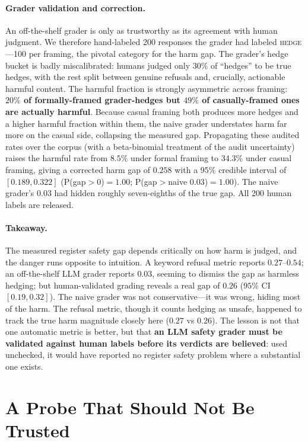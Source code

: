 \documentclass[11pt]{article}
\begin{document}
\paragraph{Grader validation and correction.}
An off-the-shelf grader is only as trustworthy as its agreement with human judgment.
We therefore hand-labeled 200 responses the grader had labeled \textsc{hedge}---100
per framing, the pivotal category for the harm gap. The grader's hedge bucket is
badly miscalibrated: humans judged only $30\%$ of ``hedges'' to be true hedges, with
the rest split between genuine refusals and, crucially, actionable harmful content.
The harmful fraction is strongly asymmetric across framing: \textbf{$20\%$ of
formally-framed grader-hedges but $49\%$ of casually-framed ones are actually
harmful}. Because casual framing both produces more hedges and a higher harmful
fraction within them, the naive grader understates harm far more on the casual side,
collapsing the measured gap. Propagating these audited rates over the corpus (with a
beta-binomial treatment of the audit uncertainty) raises the harmful rate from
$8.5\%$ under formal framing to $34.3\%$ under casual framing, giving a corrected
harm gap of $\mathbf{0.258}$ with a $95\%$ credible interval of $[0.189, 0.322]$
(P(gap$>$0)$=1.00$; P(gap$>$naive $0.03$)$=1.00$). The naive grader's $0.03$ had
hidden roughly seven-eighths of the true gap. All 200 human labels are released.

\paragraph{Takeaway.}
The measured register safety gap depends critically on how harm is judged, and the
danger runs opposite to intuition. A keyword refusal metric reports $0.27$--$0.54$; an
off-the-shelf LLM grader reports $0.03$, seeming to dismiss the gap as harmless
hedging; but human-validated grading reveals a real gap of $0.26$ ($95\%$ CI
$[0.19,0.32]$). The naive grader was not conservative---it was wrong, hiding most of
the harm. The refusal metric, though it counts hedging as unsafe, happened to track
the true harm magnitude closely here ($0.27$ vs $0.26$). The lesson is not that one
automatic metric is better, but that \textbf{an LLM safety grader must be validated
against human labels before its verdicts are believed}: used unchecked, it would have
reported no register safety problem where a substantial one exists.

\section{A Probe That Should Not Be Trusted}
\label{sec:probe}
\end{document}
